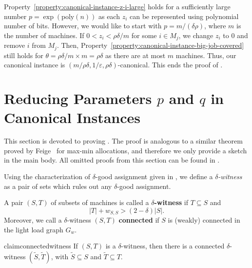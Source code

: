 \documentclass[11pt]{article}
\newenvironment{definition}{\begin{Definition}}{\end{Definition}}
\newtheorem{definition}[lemma]{Definition}
\newcounter{prop}
\newcommand{\cardinal}[1]{\left|#1\right|}
\newcommand{\eps}{\varepsilon}
\newcommand{\poly}{\mathrm{poly}}
\begin{document}
Property~\ref{property:canonical-instance-z-i-large} holds for a sufficiently large number $p = \exp(\poly(n))$ as each $z_i$ can be represented using polynomial number of bits.  However, we would like to start with $p = m/(\delta\rho)$, where $m$ is the number of machines. If $0 < z_i < \rho\delta/m$ for some $i \in M_j$, we change $z_i$ to $0$ and remove $i$ from $M_j$. Then, Property~\ref{property:canonical-instance-big-job-covered} still holds for $\theta = \rho\delta/m \times m = \rho\delta$ as there are at most $m$ machines. Thus, our canonical instance is $(m/\rho\delta, 1/\eps, \rho\delta)$-canonical.
This ends the proof of .



\section{Reducing Parameters \texorpdfstring{$p$}{p} and \texorpdfstring{$q$}{q} in Canonical Instances}\label{sec:reducing-p-and-q}
This section is devoted to proving . The proof is analogous to a similar theorem proved by Feige~\cite{Fei08} for max-min allocations, and 
therefore we only provide a sketch in the main body. 
All omitted proofs from this section can be found in .
\redpq*

Using the characterization of $\delta$-good assignment given in , we define a {\em $\delta$-witness} 
as a pair of sets which rules out any $\delta$-good assignment.

\begin{definition}[$\delta$-witness]
A pair $(S, T)$ of subsets of machines is called a {\bf $\delta$-witness} if $T \subseteq S$ and 
\begin{equation}
\cardinal{T} +  w_{S, S} > (2-\delta)|S|. \label{equation:witness}
\end{equation}
Moreover, we call a $\delta$-witness  $(S, T)$ {\bf connected} if $S$ is (weakly) connected in the light load graph $G_w$.
\end{definition}
\noindent


\begin{restatable}{claim}{connectedwitness}
\label{claim:witness-implies-connected-witness}
\label{clm:witness-implies-connected-witness}
If $(S, T)$ is a $\delta$-witness, then there is a connected $\delta$-witness $(\tilde S, \tilde T)$, with $\tilde S \subseteq S$ and $\tilde T \subseteq T$.
\end{restatable}
\end{document}
